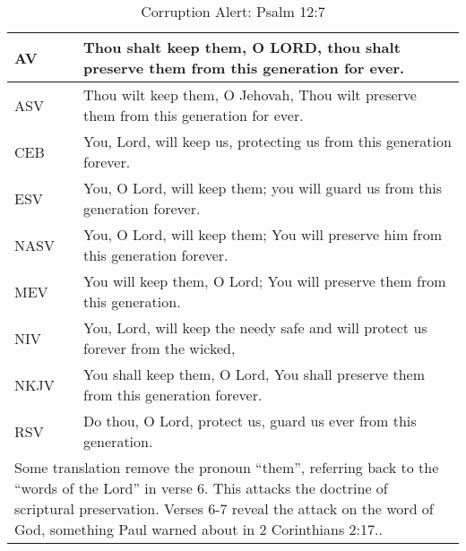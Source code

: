 
\begin{center}

\begin{table}[ht]
\centering
\begin{tabular}{|p{.5in}|p{3.5in}|}
    \hline
\textcolor[rgb]{0.00,0.00,1.00}{AV} & \textcolor[rgb]{0.00,0.00,1.00}{Thou shalt keep them, O LORD, thou shalt preserve them from this generation for ever.} \\ \hline
ASV &  Thou wilt keep them, O Jehovah, Thou wilt preserve them from this generation for ever.\\ \hline
%
CEB &  You, Lord, will keep us, protecting us from this generation forever.\\ \hline
ESV & You, O Lord, will keep them;  you will guard us from this generation forever.\\ \hline
%
NASV &  You, O Lord, will keep them; You will preserve him from this generation forever.\\ \hline
%
MEV & You will keep them, O Lord;  You will preserve them from this generation.\\ \hline
%
NIV &  You, Lord, will keep the needy safe  and will protect us forever from the wicked, \\ \hline
%
NKJV &  You shall keep them, O Lord, You shall preserve them from this generation forever.\\ \hline
%
RSV &  Do thou, O Lord, protect us,  guard us ever from this generation.\\ \hline
 \hline

\multicolumn{2}{|p{4.3in}|}{{\textcolor{jungle}{Some translation remove the pronoun ``them'', referring back to the ``words of the Lord'' in verse 6. This attacks the doctrine of scriptural preservation. Verses 6-7 reveal the attack on the word of God, something Paul warned about in 2 Corinthians 2:17.\cite{Ruckman1992PsalmsV1}.}}} \\ \hline

\end{tabular}
\caption[Corruption Alert: Psalm 12:7]{Corruption Alert: Psalm 12:7} \label{table:Corruption Psalm 12:7}

\end{table}

\end{center}